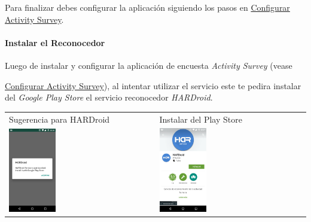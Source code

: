 Para finalizar debes configurar la aplicación siguiendo los pasos en \hyperref[config:har-config]{Configurar Activity Survey}.


\paragraph{Instalar el Reconocedor}
\label{first:instalar-el-reconocedor}
Luego de instalar y configurar la aplicación de encuesta \emph{Activity Survey} (vease {\hyperref[config:har-config]{Configurar Activity Survey}),
al intentar utilizar el servicio este te pedira instalar del \emph{Google Play Store} el servicio reconocedor \emph{HARDroid}.

\begin{table}[h]
\begin{tabular}{ll}
\textsf{\relax 
Sugerencia para HARDroid
} & \textsf{\relax 
Instalar del Play Store
}\\
    {\includegraphics[width=0.33\textwidth]{anexos/graphics/install_service.jpg}}
 & 
    {\includegraphics[width=0.33\textwidth]{anexos/graphics/inst_servplay.jpg}}
\\
\end{tabular}
\end{table}

}
